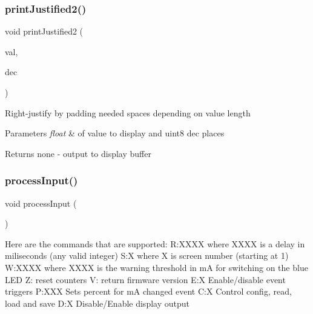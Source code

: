 \subsubsection{\texorpdfstring{print\+Justified2()}{printJustified2()}}
{\footnotesize\ttfamily void print\+Justified2 (\begin{DoxyParamCaption}\item[{float}]{val,  }\item[{uint8\+\_\+t}]{dec }\end{DoxyParamCaption})}

Right-\/justify by padding needed spaces depending on value length


\begin{DoxyParams}{Parameters}
{\em float} & of value to display and uint8 dec places \\
\hline
\end{DoxyParams}
\begin{DoxyReturn}{Returns}
none -\/ output to display buffer 
\end{DoxyReturn}
\hypertarget{_u_s_b___tester___o_l_e_d__128x64___beta__2_82_8ino_aab154b082dd58cba1ed43eb82adcf168}{}\label{_u_s_b___tester___o_l_e_d__128x64___beta__2_82_8ino_aab154b082dd58cba1ed43eb82adcf168} 
\subsubsection{\texorpdfstring{process\+Input()}{processInput()}}
{\footnotesize\ttfamily void process\+Input (\begin{DoxyParamCaption}{ }\end{DoxyParamCaption})}

Here are the commands that are supported\+: R\+:X\+X\+XX where X\+X\+XX is a delay in miliseconds (any valid integer) S\+:X where X is screen number (starting at 1) W\+:X\+X\+XX where X\+X\+XX is the warning threshold in mA for switching on the blue L\+ED Z\+: reset counters V\+: return firmware version E\+:X Enable/disable event triggers P\+:X\+XX Sets percent for mA changed event C\+:X Control config, read, load and save D\+:X Disable/\+Enable display output


